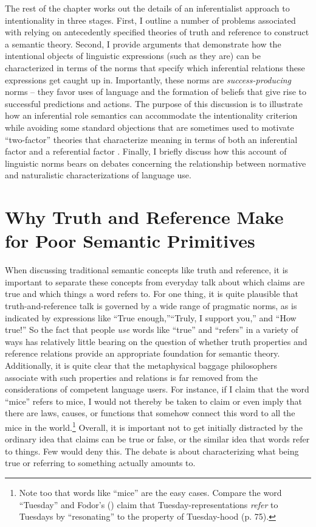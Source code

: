 The rest of the chapter works out the details of an inferentialist approach to intentionality in three stages. First, I outline a number of problems associated with relying on antecedently specified theories of truth and reference to construct a semantic theory. Second, I provide arguments that demonstrate how the intentional objects of linguistic expressions (such as they are) can be characterized in terms of the norms that specify which inferential relations these expressions get caught up in. Importantly, these norms are \textit{success-producing} norms -- they favor uses of language and the formation of beliefs that give rise to successful predictions and actions. The purpose of this discussion is to illustrate how an inferential role semantics can accommodate the intentionality criterion while avoiding some standard objections that are sometimes used to motivate ``two-factor'' theories that characterize meaning in terms of both an inferential factor and a referential factor \citep{Eliasmith:2000,Block:1986}. Finally, I briefly discuss how this account of linguistic norms bears on debates concerning the relationship between normative and naturalistic characterizations of language use. 

\section{Why Truth and Reference Make for Poor Semantic Primitives}

When discussing traditional semantic concepts like truth and reference, it is important to separate these concepts from everyday talk about which claims are true and which things a word refers to. For one thing, it is quite plausible that truth-and-reference talk is governed by a wide range of pragmatic norms, as is indicated by expressions like ``True enough,''``Truly, I support you,'' and ``How true!'' So the fact that people \textit{use} words like ``true'' and ``refers'' in a variety of ways has relatively little bearing on the question of whether truth properties and reference relations provide an appropriate foundation for semantic theory. Additionally, it is quite clear that the metaphysical baggage philosophers associate with such properties and relations is far removed from the considerations of competent language users. For instance, if I claim that the word ``mice'' refers to mice, I would not thereby be taken to claim or even imply that there are laws, causes, or functions that somehow connect this word to all the mice in the world.\footnote{Note too that words like ``mice'' are the easy cases. Compare the word ``Tuesday'' and Fodor's (\citeyear{Fodor:1998}) claim that Tuesday-representations \textit{refer} to Tuesdays by ``resonating'' to the property of Tuesday-hood (p. 75).} Overall, it is important not to get initially distracted by the ordinary idea that claims can be true or false, or the similar idea that words refer to things. Few would deny this. The debate is about characterizing what being true or referring to something actually amounts to.

